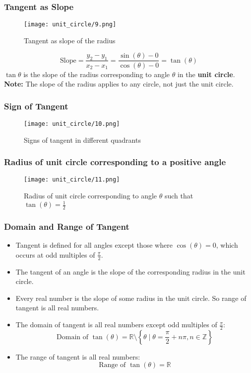 \begin{frame}
    \frametitle{Tangent as Slope}
    \begin{figure}
        \centering
        \texttt{[image: unit\_circle/9.png]}
        \caption{Tangent as slope of the radius}
    \end{figure}
    \centering
    \[ 
        \text{Slope} = \frac{y_{2} - y_{1}}{x_{2} - x_{1}} = \frac{\sin(\theta) - 0}{\cos(\theta) - 0} = \tan(\theta)
    \]
    \(\tan \theta\) is the slope of the radius corresponding to angle \(\theta\) in the \textbf{unit circle}.
    \textbf{Note:} The slope of the radius applies to any circle, not just the unit circle.
\end{frame}

\begin{frame}
    \frametitle{Sign of Tangent}
    \begin{figure}
        \centering
        \texttt{[image: unit\_circle/10.png]}
        \caption{Signs of tangent in different quadrants}
    \end{figure}
\end{frame}

\begin{frame}
    \frametitle{Radius of unit circle corresponding to a positive angle}
    \begin{figure}
        \centering
        \texttt{[image: unit\_circle/11.png]}
        \caption{Radius of unit circle corresponding to angle \(\theta\) such that \(\tan(\theta) = \frac{1}{2}\)}
    \end{figure}
\end{frame}

\begin{frame}
    \frametitle{Domain and Range of Tangent}
    \begin{itemize}
        \item Tangent is defined for all angles except those where \(\cos(\theta) = 0\), which occurs at odd multiples of \(\frac{\pi}{2}\).
        \item The tangent of an angle is the slope of the corresponding radius in the unit circle.
        \item Every real number is the slope of some radius in the unit circle. So range of tangent is all real numbers.
        \item The domain of tangent is all real numbers except odd multiples of \(\frac{\pi}{2}\):
        \[\text{Domain of } \tan(\theta) = \mathbb{R} \setminus \left\{ \theta \mid \theta = \frac{\pi}{2} + n\pi, n \in \mathbb{Z} \right\}\]
        \item The range of tangent is all real numbers:
        \[\text{Range of } \tan(\theta) = \mathbb{R}\]  
    \end{itemize}

\end{frame} 


